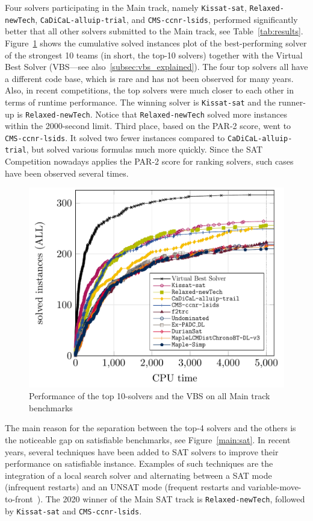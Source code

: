 \documentclass{elsarticle}
\newcommand{\solver}[1]{\texttt{#1}}
\begin{document}
Four solvers participating in the Main track, namely \solver{Kissat-sat}, \solver{Relaxed-newTech}, \solver{CaDiCaL-alluip-trial}, and \solver{CMS-ccnr-lsids},
performed significantly better that all other solvers submitted to the Main track, see Table~\ref{tab:results}.
Figure~\ref{main:all} shows the cumulative solved instances plot of the best-performing solver of the strongest
10 teams (in short, the top-10 solvers)  together with the Virtual Best Solver (VBS---see also~\ref{subsec:vbs_explained}).
The four top solvers all have a different code base, which is rare and has not been observed for many years.
Also, in recent competitions, the top solvers were much closer to each other in terms of runtime performance.
The winning solver is \solver{Kissat-sat} and the runner-up is \solver{Relaxed-newTech}. Notice that 
\solver{Relaxed-newTech} solved more instances within the 2000-second limit.
Third place, based on the PAR-2 score, went to \solver{CMS-ccnr-lsids}. It solved two fewer instances
compared to \solver{CaDiCaL-alluip-trial}, but solved various formulas much more quickly. 
Since the SAT Competition nowadays applies the PAR-2 score for ranking solvers, such cases have been observed several times. 


\begin{figure}[ht]
\centering
\includegraphics[width=.9\textwidth]{img/paper-main-top10-ALL.pdf}
\caption{Performance of the top 10-solvers and the VBS on all  Main track benchmarks}
\label{main:all}
\end{figure}


The main reason for the separation between the top-4 solvers and the others is the noticeable gap on satisfiable benchmarks, 
see Figure~\ref{main:sat}. In recent years, several techniques have been added to SAT solvers to improve
their performance on satisfiable instance. Examples of such techniques are the integration of a local search
solver and alternating between a SAT mode (infrequent restarts) and an UNSAT mode (frequent restarts
and variable-move-to-front~\cite{Ryan:2004:Thesis}). The 2020 winner of the Main SAT track is \solver{Relaxed-newTech}, followed by
\solver{Kissat-sat} and \solver{CMS-ccnr-lsids}.
\end{document}
